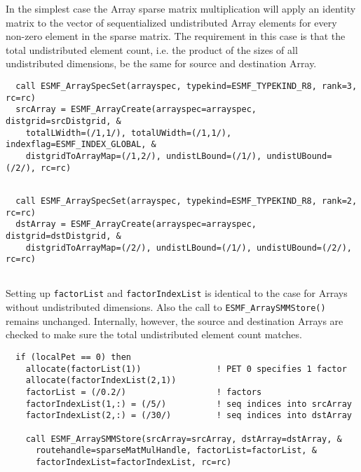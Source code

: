    In the simplest case the Array sparse matrix multiplication will apply an
   identity matrix to the vector of sequentialized undistributed Array elements
   for every non-zero element in the sparse matrix. The requirement in this case
   is that the total undistributed element count, i.e. the product of the sizes 
   of all undistributed dimensions, be the same for source and destination Array. 

 \begin{verbatim}
  call ESMF_ArraySpecSet(arrayspec, typekind=ESMF_TYPEKIND_R8, rank=3, rc=rc)
  srcArray = ESMF_ArrayCreate(arrayspec=arrayspec, distgrid=srcDistgrid, &
    totalLWidth=(/1,1/), totalUWidth=(/1,1/), indexflag=ESMF_INDEX_GLOBAL, &
    distgridToArrayMap=(/1,2/), undistLBound=(/1/), undistUBound=(/2/), rc=rc)
 
\end{verbatim}
 

 \begin{verbatim}
  call ESMF_ArraySpecSet(arrayspec, typekind=ESMF_TYPEKIND_R8, rank=2, rc=rc)
  dstArray = ESMF_ArrayCreate(arrayspec=arrayspec, distgrid=dstDistgrid, &
    distgridToArrayMap=(/2/), undistLBound=(/1/), undistUBound=(/2/), rc=rc)
 
\end{verbatim}
 

   Setting up {\tt factorList} and {\tt factorIndexList} is identical to the 
   case for Arrays without undistributed dimensions. Also the call to 
   {\tt ESMF\_ArraySMMStore()} remains unchanged. Internally, however,
   the source and destination Arrays are checked to make sure the total
   undistributed element count matches. 

 \begin{verbatim}
  if (localPet == 0) then
    allocate(factorList(1))               ! PET 0 specifies 1 factor
    allocate(factorIndexList(2,1))
    factorList = (/0.2/)                  ! factors
    factorIndexList(1,:) = (/5/)          ! seq indices into srcArray
    factorIndexList(2,:) = (/30/)         ! seq indices into dstArray
    
    call ESMF_ArraySMMStore(srcArray=srcArray, dstArray=dstArray, &
      routehandle=sparseMatMulHandle, factorList=factorList, &
      factorIndexList=factorIndexList, rc=rc)
 
\end{verbatim}
 
